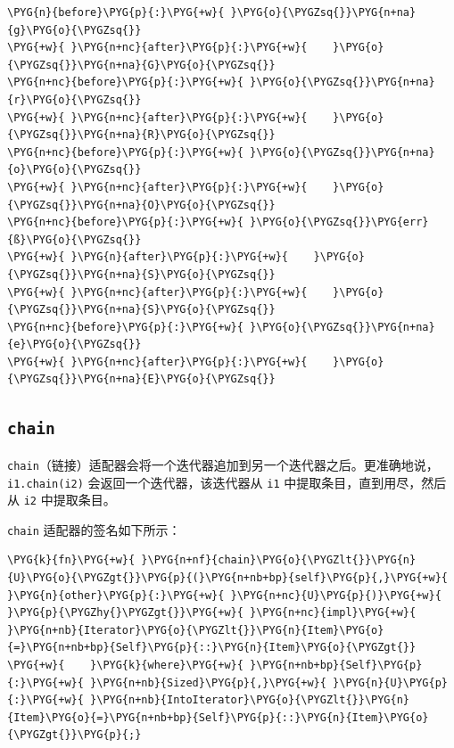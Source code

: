 \begin{Verbatim}[commandchars=\\\{\},breaklines=true,breakanywhere=true,fontsize=\codefont,xleftmargin=17bp]
\PYG{n}{before}\PYG{p}{:}\PYG{+w}{ }\PYG{o}{\PYGZsq{}}\PYG{n+na}{g}\PYG{o}{\PYGZsq{}}
\PYG{+w}{ }\PYG{n+nc}{after}\PYG{p}{:}\PYG{+w}{    }\PYG{o}{\PYGZsq{}}\PYG{n+na}{G}\PYG{o}{\PYGZsq{}}
\PYG{n+nc}{before}\PYG{p}{:}\PYG{+w}{ }\PYG{o}{\PYGZsq{}}\PYG{n+na}{r}\PYG{o}{\PYGZsq{}}
\PYG{+w}{ }\PYG{n+nc}{after}\PYG{p}{:}\PYG{+w}{    }\PYG{o}{\PYGZsq{}}\PYG{n+na}{R}\PYG{o}{\PYGZsq{}}
\PYG{n+nc}{before}\PYG{p}{:}\PYG{+w}{ }\PYG{o}{\PYGZsq{}}\PYG{n+na}{o}\PYG{o}{\PYGZsq{}}
\PYG{+w}{ }\PYG{n+nc}{after}\PYG{p}{:}\PYG{+w}{    }\PYG{o}{\PYGZsq{}}\PYG{n+na}{O}\PYG{o}{\PYGZsq{}}
\PYG{n+nc}{before}\PYG{p}{:}\PYG{+w}{ }\PYG{o}{\PYGZsq{}}\PYG{err}{ß}\PYG{o}{\PYGZsq{}}
\PYG{+w}{ }\PYG{n}{after}\PYG{p}{:}\PYG{+w}{    }\PYG{o}{\PYGZsq{}}\PYG{n+na}{S}\PYG{o}{\PYGZsq{}}
\PYG{+w}{ }\PYG{n+nc}{after}\PYG{p}{:}\PYG{+w}{    }\PYG{o}{\PYGZsq{}}\PYG{n+na}{S}\PYG{o}{\PYGZsq{}}
\PYG{n+nc}{before}\PYG{p}{:}\PYG{+w}{ }\PYG{o}{\PYGZsq{}}\PYG{n+na}{e}\PYG{o}{\PYGZsq{}}
\PYG{+w}{ }\PYG{n+nc}{after}\PYG{p}{:}\PYG{+w}{    }\PYG{o}{\PYGZsq{}}\PYG{n+na}{E}\PYG{o}{\PYGZsq{}}
\end{Verbatim}

\subsection{\texttt{chain}}

\texttt{chain}（链接）适配器会将一个迭代器追加到另一个迭代器之后。更准确地说，\texttt{i1.chain(i2)} 会返回一个迭代器，该迭代器从 \texttt{i1} 中提取条目，直到用尽，然后从 \texttt{i2} 中提取条目。

\texttt{chain} 适配器的签名如下所示：

\begin{Verbatim}[commandchars=\\\{\},breaklines=true,breakanywhere=true,fontsize=\codefont,xleftmargin=17bp]
\PYG{k}{fn}\PYG{+w}{ }\PYG{n+nf}{chain}\PYG{o}{\PYGZlt{}}\PYG{n}{U}\PYG{o}{\PYGZgt{}}\PYG{p}{(}\PYG{n+nb+bp}{self}\PYG{p}{,}\PYG{+w}{ }\PYG{n}{other}\PYG{p}{:}\PYG{+w}{ }\PYG{n+nc}{U}\PYG{p}{)}\PYG{+w}{ }\PYG{p}{\PYGZhy{}\PYGZgt{}}\PYG{+w}{ }\PYG{n+nc}{impl}\PYG{+w}{ }\PYG{n+nb}{Iterator}\PYG{o}{\PYGZlt{}}\PYG{n}{Item}\PYG{o}{=}\PYG{n+nb+bp}{Self}\PYG{p}{::}\PYG{n}{Item}\PYG{o}{\PYGZgt{}}
\PYG{+w}{    }\PYG{k}{where}\PYG{+w}{ }\PYG{n+nb+bp}{Self}\PYG{p}{:}\PYG{+w}{ }\PYG{n+nb}{Sized}\PYG{p}{,}\PYG{+w}{ }\PYG{n}{U}\PYG{p}{:}\PYG{+w}{ }\PYG{n+nb}{IntoIterator}\PYG{o}{\PYGZlt{}}\PYG{n}{Item}\PYG{o}{=}\PYG{n+nb+bp}{Self}\PYG{p}{::}\PYG{n}{Item}\PYG{o}{\PYGZgt{}}\PYG{p}{;}
\end{Verbatim}

